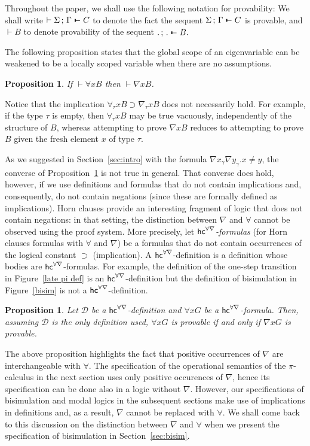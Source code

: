 \documentclass{acmtrans2m}
\newtheorem{proposition}[theorem]{Proposition}
\def\Dscr{{\mathcal D}}
\def\relbar{\mathrel{\smash-}}
\def\joinrelm{\mathrel{\mkern-3.2mu}}
\def\tailpiece{\kern 1pt\vrule height 1ex width 0.3ex depth -.25ex}
\def\seqsym{\mathrel{\tailpiece\joinrelm\relbar}}
\newcommand{\NSeq}[3]{#1\,;\,#2 \seqsym #3}
\newcommand{\hc }{\hbox{\sf hc}}
\newcommand{\hcun}{\hc^{\forall\nabla} }
\newcommand{\oimp}{\supset}
\begin{document}
Throughout the paper, we shall use the following notation for provability:
We shall write $\vdash \NSeq \Sigma \Gamma C$ 
to denote the fact the sequent $\NSeq \Sigma \Gamma C$ is provable, and 
$\vdash B$ to denote provability of the sequent $\NSeq . . B.$

The following proposition states that the global scope of an
eigenvariable can be weakened to be a locally scoped variable when
there are no assumptions.

\begin{proposition}
\label{prop:forall nabla}
If $\vdash\forall x B$  then $\vdash\nabla x B$.
\end{proposition}

Notice that the implication $\forall_\tau x B \oimp
\nabla_\tau x B$ does not necessarily hold.   For example, if the type $\tau$ is
empty, then $\forall_\tau x B$ may be true vacuously, independently of the
structure of $B$, whereas attempting to prove $\nabla x B$ reduces to
attempting to prove $B$ given the fresh element $x$ of type $\tau$. 

As we suggested in Section~\ref{sec:intro} with the formula $\nabla
x_\gamma\nabla y_\gamma.x\neq y$, the converse of
Proposition~\ref{prop:forall nabla} is not true in general.  That
converse does hold, however, if we use definitions and formulas that
do not contain implications and, consequently, do not contain
negations (since these are formally defined as implications).
Horn clauses provide an 
interesting fragment of logic that does not contain negations: in
that setting, the distinction between $\nabla$ and $\forall$ cannot be
observed using the proof system.  More precisely, let {\em
$\hcun$-formulas} (for Horn clauses formulas with $\forall$ and
$\nabla$) be a formulas that do not contain occurrences of the logical
constant $\oimp$ (implication).  A $\hcun$-definition is a definition
whose bodies are $\hcun$-formulas.  For example, the definition of the
one-step transition in Figure~\ref{late pi def} is an
$\hcun$-definition but the definition of bisimulation in
Figure~\ref{bisim} is not a $\hcun$-definition.

\begin{proposition}\label{prop:nabla forall}
Let $\Dscr$ be a $\hcun$-definition and $\forall x G$ be a $\hcun$-formula.
Then, assuming $\Dscr$ is the only definition used, $\forall x G$ is provable  
if and only if $\nabla x G$ is provable.
\end{proposition}

The above proposition highlights the fact that positive occurrences of
$\nabla$ are interchangeable with $\forall.$ The specification of the
operational semantics of the $\pi$-calculus in the next section uses
only positive occurences of $\nabla$, hence its specification can be
done also in a logic without $\nabla$.  However, our specifications of
bisimulation and modal logics in the subsequent sections make use of
implications in definitions and, as a result, $\nabla$ cannot be
replaced with $\forall$.  We shall come back to this discussion on the
distinction between $\nabla$ and $\forall$ when we present the
specification of bisimulation in Section~\ref{sec:bisim}.
\end{document}
